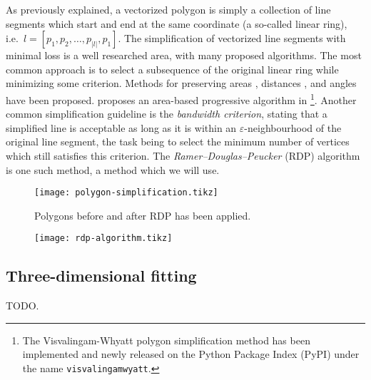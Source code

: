 As previously explained, a vectorized polygon is simply a collection of line segments which start and end at the same coordinate (a so-called linear ring), i.e.\ $l = [p_1, p_2, \ldots, p_{|l|}, p_1]$.
The simplification of vectorized line segments with minimal loss is a well researched area, with many proposed algorithms.
The most common approach is to select a subsequence of the original linear ring while minimizing some criterion.
Methods for preserving areas \cite{ls-area-preserving}, distances \cite{ls-distance-preserving}, and angles \cite{ls-angle-preserving} have been proposed.
\citeauthor{ls-vw} proposes an area-based progressive algorithm in \cite{ls-vw}\footnote{The Visvalingam-Whyatt polygon simplification method has been implemented and newly released on the Python Package Index (PyPI) under the name \texttt{visvalingamwyatt}.}.
Another common simplification guideline is the \textit{bandwidth criterion}, stating that a simplified line is acceptable as long as it is within an $\varepsilon$-neighbourhood of the original line segment, the task being to select the minimum number of vertices which still satisfies this criterion.
The \textit{Ramer–Douglas–Peucker} (RDP) algorithm\cite{ls-rdp} is one such method, a method which we will use.

\begin{figure}[H]
  \centering
  \texttt{[image: polygon-simplification.tikz]}
  \caption{Polygons before and after RDP has been applied.}
\end{figure}

\begin{figure}[p]
  \centering
  \texttt{[image: rdp-algorithm.tikz]}
  \label{}
\end{figure}

\subsection{Three-dimensional fitting}

TODO.
